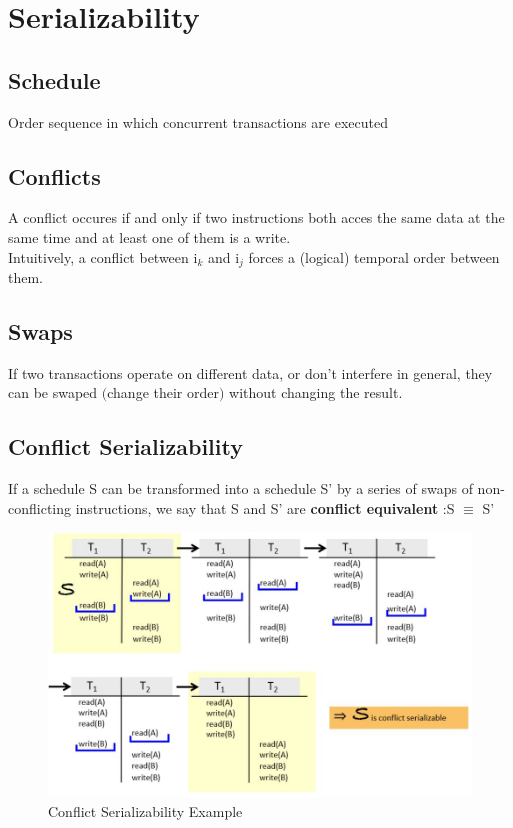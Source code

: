 	\section{Serializability}
		
		\subsection{Schedule}
		
			Order sequence in which concurrent transactions are executed
		
		\subsection{Conflicts}
		
			A conflict occures if and only if two instructions both acces the same data at the same time and at least one of them is a write.\\
			Intuitively, a conflict between i$ _k $ and i$ _j $ forces a (logical) temporal order between them. 
		
		\subsection{Swaps}
		
			If two transactions operate on different data, or don't interfere in general, they can be swaped $ ( $change their order$ ) $ without changing the result.
		
		\subsection{Conflict Serializability}
			
			If a schedule S can be transformed into a schedule S’ by a series of swaps of non-conflicting instructions, we say that S and S’ are \textbf{conflict equivalent} :S $ \equiv $ S’ 
			\begin{figure}[h!]
				\includegraphics[scale=0.5]{res/conflict_serializable.jpg}
				\caption{Conflict Serializability Example}
			\end{figure}
		
